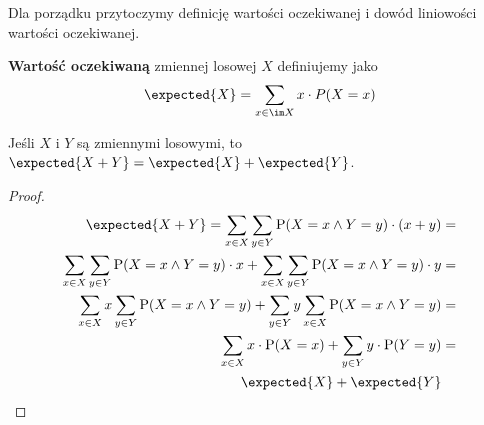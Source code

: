Dla porządku przytoczymy definicję wartości oczekiwanej i dowód liniowości wartości oczekiwanej.

\begin{definition}
	\textbf{Wartość oczekiwaną} zmiennej losowej \( X \) definiujemy jako
	\[
		\expected{X} = \sum_{x \in \im X} x \cdot P(X = x)
	\]
\end{definition}

\begin{theorem}
	Jeśli \(X\) i \(Y\) są zmiennymi losowymi, to \( \expected{X + Y} = \expected{X} + \expected{Y} \).
\end{theorem}
\begin{proof}
	\begin{align*}
		\expected{X+Y} = \sum_{x \in X} \sum_{y \in Y} \mathrm{P}(X=x \land Y=y) \cdot (x+y)                                              & = \\
		\sum_{x \in X} \sum_{y \in Y} \mathrm{P}(X=x \land Y=y) \cdot x + \sum_{x \in X} \sum_{y \in Y} \mathrm{P}(X=x \land Y=y) \cdot y & = \\
		\sum_{x \in X} x \sum_{y \in Y} \mathrm{P}(X=x \land Y=y) + \sum_{y \in Y} y \sum_{x \in X} \mathrm{P}(X=x \land Y=y)             & = \\
		\sum_{x \in X} x \cdot \mathrm{P}(X=x) + \sum_{y \in Y} y \cdot \mathrm{P}(Y=y)                                                   & = \\
		\expected{X} + \expected{Y}
	\end{align*}
\end{proof}